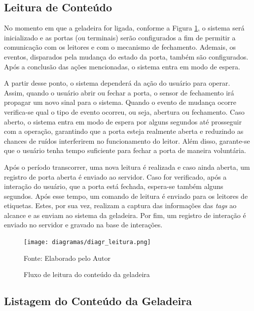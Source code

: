 \subsection{Leitura de Conteúdo}

No momento em que a geladeira for ligada, conforme a Figura \ref{fig:cap5_diagr_leitura}, o sistema será inicializado e as portas (ou terminais) serão configurados a fim de permitir a comunicação com os leitores e com o mecanismo de fechamento. Ademais, os eventos, disparados pela mudança do estado da porta, também são configurados. Após a conclusão das ações mencionadas, o sistema entra em modo de espera.

A partir desse ponto, o sistema dependerá da ação do usuário para operar. Assim, quando o usuário abrir ou fechar a porta, o sensor de fechamento irá propagar um novo sinal para o sistema. Quando o evento de mudança ocorre verifica-se qual o tipo de evento ocorreu, ou seja, abertura ou fechamento. Caso aberto, o sistema entra em modo de espera por alguns segundos até prosseguir com a operação, garantindo que a porta esteja realmente aberta e reduzindo as chances de ruídos interferirem no funcionamento do leitor. Além disso, garante-se que o usuário tenha tempo suficiente para fechar a porta de maneira voluntária. 

Após o período transcorrer, uma nova leitura é realizada e caso ainda aberta, um registro de porta aberta é enviado ao servidor. Caso for verificado, após a interação do usuário, que a porta está fechada, espera-se também alguns segundos. Após esse tempo, um comando de leitura é enviado para os leitores de etiquetas. Estes, por sua vez, realizam a captura das informações das \textit{tags} ao alcance e as enviam ao sistema da geladeira. Por fim, um registro de interação é enviado no servidor e gravado na base de interações.

\begin{figure}[H]
    \caption{Fluxo de leitura do conteúdo da geladeira}
    \label{fig:cap5_diagr_leitura}
    \texttt{[image: diagramas/diagr\_leitura.png]}
    
    \footnotesize{Fonte: Elaborado pelo Autor}
\end{figure}

\subsection{Listagem do Conteúdo da Geladeira}

